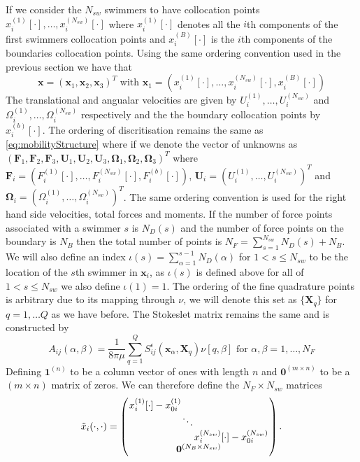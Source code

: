 If we consider the $N_{sw}$ swimmers to have collocation points $x_i^{(1)}[\cdot],\dots,x_i^{(N_{sw})}[\cdot]$ where $x_i^{(1)}[\cdot]$ denotes all the $i$th components of the first swimmers collocation points and $x_i^{(B)}[\cdot]$ is the $i$th components of the boundaries collocation points. Using the same ordering convention used in the previous section we have that
\begin{equation*}
    \bm{x} = (\bm{x}_1,\bm{x}_2,\bm{x}_3)^T \text{ with } \bm{x}_1=(x_i^{(1)}[\cdot],\dots,x_i^{(N_{sw})}[\cdot],x_i^{(B)}[\cdot])
\end{equation*}
The translational and angualar velocities are given by $U_i^{(1)},\dots,U_i^{(N_{sw})}$ and $\Omega_i^{(1)},\dots,\Omega_i^{(N_{sw})}$ respectively and the the boundary collocation points by $x_i^{(b)}[\cdot]$. The ordering of discritisation remains the same as \cref{eq:mobilityStructure} where if we denote the vector of unknowns as $(\bm{F}_1, \bm{F}_2, \bm{F}_3, \bm{U}_1,\bm{U}_2,\bm{U}_3,\bm{\Omega}_1,\bm{\Omega}_2,\bm{\Omega}_3)^T$ where $\bm{F}_i = (F_i^{(1)}[\cdot],\dots,F_i^{(N_{sw})}[\cdot],F_i^{(b)}[\cdot])$, $\bm{U}_i = (U_i^{(1)},\dots,U_i^{(N_{sw})})^T$ and $\bm{\Omega}_i = (\Omega_i^{(1)},\dots,\Omega_i^{(N_{sw})})^T$. The same ordering convention is used for the right hand side velocities, total forces and moments. If the number of force points associated with a swimmer $s$ is $N_{D}(s)$ and the number of force points on the boundary is $N_B$ then the total number of points is $N_F=\sum_{s=1}^{N_{sw}} N_D(s) + N_B$. We will also define an index $\iota(s)=\sum_{\alpha=1}^{s-1}N_D(\alpha)$ for $1<s\leq N_{sw}$ to be the location of the $s$th swimmer in $\bm{x}_i$, as $\iota(s)$ is defined above for all of $1<s\leq N_{sw}$ we also define $\iota(1)=1$. The ordering of the fine quadrature points is arbitrary due to its mapping through $\nu$, we will denote this set as $\{\bm{X}_q\}$ for $q=1,\dots{Q}$ as we have before. The Stokeslet matrix remains the same and is constructed by
\begin{equation*}
    A_{ij}(\alpha,\beta) = \frac{1}{8\pi\mu} \sum_{q=1}^Q S_{ij}^\epsilon (\bm{x}_\alpha,\bm{X}_{q})\nu[q,\beta] \text { for } \alpha,\beta = 1,\dots,N_F
\end{equation*}
Defining $\bm{1}^{(n)}$ to be a column vector of ones with length $n$ and $\bm{0}^{(m\times n)}$ to be a $(m\times n)$ matrix of zeros. We can therefore define the $N_F \times N_{sw}$ matrices
\begin{equation*}
\arraycolsep=0.4pt\def\arraystretch{1}
    \tilde{x}_i(\cdot,\cdot)=\left(\begin{array}{c}
         \begin{array}{ccc}
             x_i^{(1)}[\cdot]-x_{0i}^{(1)} & & \\
              & \ddots & \\
              & & x_i^{(N_{sw})}[\cdot]-x_{0i}^{(N_{sw})}
         \end{array}\\
         \bm{0}^{(N_B \times N_{sw})}
    \end{array}\right).
\end{equation*}

